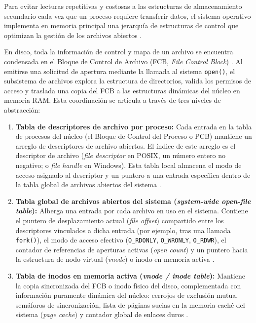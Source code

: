 \documentclass[12pt]{article}
\begin{document}
Para evitar lecturas repetitivas y costosas a las estructuras de almacenamiento secundario cada vez que un proceso requiere transferir datos, el sistema operativo implementa en memoria principal una jerarquía de estructuras de control que optimizan la gestión de los archivos abiertos \parencite[\S 11.2, p.\ 372]{silberschatz2006fundamentos}.

En disco, toda la información de control y mapa de un archivo se encuentra condensada en el Bloque de Control de Archivo (FCB, \textit{File Control Block}) \parencite[\S 11.2, p.\ 373]{silberschatz2006fundamentos}. Al emitirse una solicitud de apertura mediante la llamada al sistema \texttt{open()}, el subsistema de archivos explora la estructura de directorios, valida los permisos de acceso y traslada una copia del FCB a las estructuras dinámicas del núcleo en memoria RAM. Esta coordinación se articula a través de tres niveles de abstracción:

\begin{enumerate}[noitemsep, topsep=2pt]
    \item \textbf{Tabla de descriptores de archivo por proceso:} Cada entrada en la tabla de procesos del núcleo (el Bloque de Control del Proceso o PCB) mantiene un arreglo de descriptores de archivo abiertos. El índice de este arreglo es el descriptor de archivo (\textit{file descriptor} en POSIX, un número entero no negativo; o \textit{file handle} en Windows). Esta tabla local almacena el modo de acceso asignado al descriptor y un puntero a una entrada específica dentro de la tabla global de archivos abiertos del sistema \parencite[\S 11.2, p.\ 373]{silberschatz2006fundamentos}.
    \item \textbf{Tabla global de archivos abiertos del sistema (\textit{system-wide open-file table}):} Alberga una entrada por cada archivo en uso en el sistema. Contiene el puntero de desplazamiento actual (\textit{file offset}) compartido entre los descriptores vinculados a dicha entrada (por ejemplo, tras una llamada \texttt{fork()}), el modo de acceso efectivo (\texttt{O\_RDONLY}, \texttt{O\_WRONLY}, \texttt{O\_RDWR}), el contador de referencias de aperturas activas (\textit{open count}) y un puntero hacia la estructura de nodo virtual (\textit{vnode}) o inodo en memoria activa \parencite[\S 10.1.2, p.\ 336]{silberschatz2006fundamentos}.
    \item \textbf{Tabla de inodos en memoria activa (\textit{vnode / inode table}):} Mantiene la copia sincronizada del FCB o inodo físico del disco, complementada con información puramente dinámica del núcleo: cerrojos de exclusión mutua, semáforos de sincronización, lista de páginas sucias en la memoria caché del sistema (\textit{page cache}) y contador global de enlaces duros \parencite[\S 8.6.2, p.\ 473]{carretero2001sistemas}.
\end{enumerate}
\end{document}
